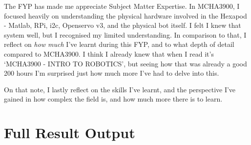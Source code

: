 \documentclass{UoNMCHA}
\numberwithin{equation}{section}
\begin{document}
The FYP has made me appreciate Subject Matter Expertise. In MCHA3900, I focused heavily on understanding the physical hardware involved in the Hexapod - Matlab, RPi, i2c, Openservo v3, and the physical bot itself. I felt I knew that system well, but I recognised my limited understanding. In comparison to that, I reflect on \textit{how much} I've learnt during this FYP, and to what depth of detail compared to MCHA3900. I think I already knew that when I read it's `MCHA3900 - INTRO TO ROBOTICS', but seeing how that was already a good 200 hours I'm surprised just how much more I've had to delve into this.

On that note, I lastly reflect on the skills I've learnt, and the perspective I've gained in how complex the field is, and how much more there is to learn.


\section{Full Result Output}
\end{document}
